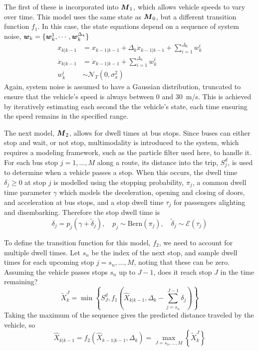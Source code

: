 The first of these is incorporated into $\mbox{$\boldsymbol{M}$}_1$,
which allows vehicle speeds to vary over time.
This model uses the same state as $\mbox{$\boldsymbol{M}$}_0$,
but a different transition function $f_1$.
In this case, the state equations depend on a sequence of system noise,
$\boldsymbol{w}_k = \{\boldsymbol{w}_k^1, \cdots, \boldsymbol{w}_k^{\Delta_k}\}$
\begin{align}
\label{eq:transition_f1}
x_{k|k-1} &= x_{k-1|k-1} + \Delta_k \dot x_{k-1|k-1} + \sum_{i=1}^{\Delta_k} w_k^i \nonumber \\
\dot x_{k|k-1} &= \dot x_{k-1|k-1} + \sum_{i=1}^{\Delta_k} w_k^i \\
w_k^i &\sim \mathcal{N}_T(0, \sigma_x^2) \nonumber
\end{align}
Again, system noise is assumed to have a Gaussian distribution, 
truncated to ensure that the vehicle's speed is always between 0 and 30~m/s.
This is achieved by iteratively estimating each second the the vehicle's state,
each time ensuring the speed remains in the specified range.


The next model, $\mbox{$\boldsymbol{M}$}_2$, allows for dwell times at bus stops.
Since buses can either stop and wait, or not stop,
multimodality is introduced to the system,
which requires a modeling framework, such as the particle filter used here,
to handle it.
For each bus stop $j = 1, \ldots, M$ along a route,
its distance into the trip, $S_j^d$, 
is used to determine when a vehicle passes a stop.
When this occurs, the dwell time $\delta_j \geq 0$ at stop $j$ is modelled
using the stopping probability, $\pi_j$,
a common dwell time parameter $\gamma$ which models the
deceleration, opening and closing of doors, and acceleration at bus stops,
and a stop dwell time $\tau_j$ for passengers alighting and disembarking.
Therefore the stop dwell time is
\begin{equation}
\label{eq:dwell_time}
\delta_j = p_j(\gamma + \tilde\delta_j),\quad
p_j \sim \mathrm{Bern}(\pi_j),\quad
\tilde\delta_j \sim \mathcal{E}(\tau_j)
\end{equation}

To define the transition function for this model, $f_2$,
we need to account for multiple dwell times.
Let $s_n$ be the index of the next stop,
and sample dwell times for each upcoming stop $j = s_n, \ldots, M$,
noting that these can be zero.
Assuming the vehicle passes stops $s_n$ up to $J-1$,
does it reach stop $J$ in the time remaining?
\begin{equation}
\tilde X_k^J = \min\left\{
S_J^d, f_1(\hat X_{k|k-1}, \Delta_k - \sum_{j=s_n}^{J-1}\delta_j)\right\}
\end{equation}
Taking the maximum of the sequence gives the predicted distance
traveled by the vehicle, so
\begin{equation}
\hat X_{k|k-1} = f_2 (\hat X_{k-1|k-1}, \Delta_k) =
\max_{J = s_n, \ldots, M}\left\{
    \tilde X_k^J
\right\}
\end{equation}

